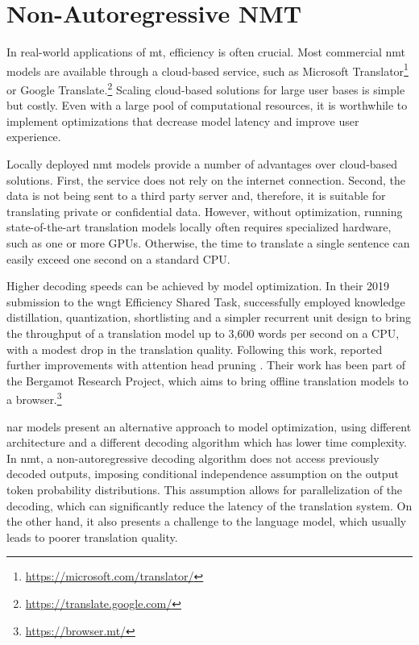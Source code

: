 \chapter{Non-Autoregressive NMT}
\label{chap:nat}

In real-world applications of \ac{mt}, efficiency is often crucial.  Most
commercial \ac{nmt} models are available through a cloud-based service, such as
Microsoft Translator\footnote{\url{https://microsoft.com/translator/}} or
Google Translate.\footnote{\url{https://translate.google.com/}} Scaling
cloud-based solutions for large user bases is simple but costly. Even with a
large pool of computational resources, it is worthwhile to implement
optimizations that decrease model latency and improve user experience.

Locally deployed \ac{nmt} models provide a number of advantages over
cloud-based solutions. First, the service does not rely on the internet
connection. Second, the data is not being sent to a third party server and,
therefore, it is suitable for translating private or confidential data.
However, without optimization, running state-of-the-art translation models
locally often requires specialized hardware, such as one or more
GPUs. Otherwise, the time to translate a single sentence can easily exceed one
second on a standard CPU.

Higher decoding speeds can be achieved by model optimization. In their 2019
submission to the \ac{wngt} Efficiency Shared Task,
\citet{kim-etal-2019-research} successfully employed knowledge distillation,
quantization, shortlisting \citep{jean-etal-2015-using} and a simpler recurrent
unit design to bring the throughput of a translation model up to 3,600 words
per second on a CPU, with a modest drop in the translation quality. Following
this work, \citet{bogoychev-etal-2020-edinburghs} reported further improvements
with attention head pruning \citep{voita-etal-2019-analyzing}. Their work has
been part of the Bergamot Research Project, which aims to bring offline
translation models to a browser.\footnote{\url{https://browser.mt/}}

\Ac{nar} models present an alternative approach to model optimization, using
different architecture and a different decoding algorithm which has lower time
complexity.  In \ac{nmt}, a non-autoregressive decoding algorithm does not
access previously decoded outputs, imposing conditional independence assumption
on the output token probability distributions. This assumption allows for
parallelization of the decoding, which can significantly reduce the latency of
the translation system. On the other hand, it also presents a challenge to the
language model, which usually leads to poorer translation quality.

